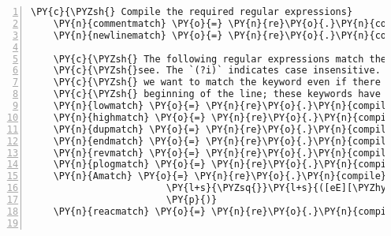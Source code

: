 \begin{Verbatim}[commandchars=\\\{\},fontsize=\small,numbers=left,firstnumber=1,stepnumber=2,firstline=2]
    \PY{c}{\PYZsh{} Compile the required regular expressions}
    \PY{n}{commentmatch} \PY{o}{=} \PY{n}{re}\PY{o}{.}\PY{n}{compile}\PY{p}{(}\PY{l+s}{r\PYZsq{}}\PY{l+s}{\PYZca{}}\PY{l+s}{\PYZbs{}}\PY{l+s}{!}\PY{l+s}{\PYZsq{}}\PY{p}{)}
    \PY{n}{newlinematch} \PY{o}{=} \PY{n}{re}\PY{o}{.}\PY{n}{compile}\PY{p}{(}\PY{l+s}{r\PYZsq{}}\PY{l+s}{\PYZca{}}\PY{l+s}{\PYZbs{}}\PY{l+s}{n}\PY{l+s}{\PYZsq{}}\PY{p}{)}

    \PY{c}{\PYZsh{} The following regular expressions match the keywords we expect to}
    \PY{c}{\PYZsh{}see. The `(?i)` indicates case insensitive. For certain keywords,}
    \PY{c}{\PYZsh{} we want to match the keyword even if there is space at the}
    \PY{c}{\PYZsh{} beginning of the line; these keywords have `\PYZca{}[\PYZbs{}s]*`.}
    \PY{n}{lowmatch} \PY{o}{=} \PY{n}{re}\PY{o}{.}\PY{n}{compile}\PY{p}{(}\PY{l+s}{r\PYZsq{}}\PY{l+s}{(?i)\PYZca{}[}\PY{l+s}{\PYZbs{}}\PY{l+s}{s]*LOW}\PY{l+s}{\PYZsq{}}\PY{p}{)}
    \PY{n}{highmatch} \PY{o}{=} \PY{n}{re}\PY{o}{.}\PY{n}{compile}\PY{p}{(}\PY{l+s}{r\PYZsq{}}\PY{l+s}{(?i)\PYZca{}[}\PY{l+s}{\PYZbs{}}\PY{l+s}{s]*HIGH}\PY{l+s}{\PYZsq{}}\PY{p}{)}
    \PY{n}{dupmatch} \PY{o}{=} \PY{n}{re}\PY{o}{.}\PY{n}{compile}\PY{p}{(}\PY{l+s}{r\PYZsq{}}\PY{l+s}{(?i)}\PY{l+s}{\PYZbs{}}\PY{l+s}{bDUP}\PY{l+s}{\PYZbs{}}\PY{l+s}{b|}\PY{l+s}{\PYZbs{}}\PY{l+s}{bDUPLICATE}\PY{l+s}{\PYZbs{}}\PY{l+s}{b}\PY{l+s}{\PYZsq{}}\PY{p}{)}
    \PY{n}{endmatch} \PY{o}{=} \PY{n}{re}\PY{o}{.}\PY{n}{compile}\PY{p}{(}\PY{l+s}{r\PYZsq{}}\PY{l+s}{(?i)\PYZca{}END}\PY{l+s}{\PYZsq{}}\PY{p}{)}
    \PY{n}{revmatch} \PY{o}{=} \PY{n}{re}\PY{o}{.}\PY{n}{compile}\PY{p}{(}\PY{l+s}{r\PYZsq{}}\PY{l+s}{(?i)\PYZca{}[}\PY{l+s}{\PYZbs{}}\PY{l+s}{s]*REV}\PY{l+s}{\PYZsq{}}\PY{p}{)}
    \PY{n}{plogmatch} \PY{o}{=} \PY{n}{re}\PY{o}{.}\PY{n}{compile}\PY{p}{(}\PY{l+s}{r\PYZsq{}}\PY{l+s}{(?i)\PYZca{}[}\PY{l+s}{\PYZbs{}}\PY{l+s}{s]*PLOG}\PY{l+s}{\PYZsq{}}\PY{p}{)}
    \PY{n}{Amatch} \PY{o}{=} \PY{n}{re}\PY{o}{.}\PY{n}{compile}\PY{p}{(}\PY{l+s}{r\PYZsq{}}\PY{l+s}{((?\PYZlt{}![}\PY{l+s}{\PYZbs{}}\PY{l+s}{w}\PY{l+s}{\PYZbs{}}\PY{l+s}{\PYZhy{}])([\PYZhy{}+]?[0\PYZhy{}9]+(}\PY{l+s}{\PYZbs{}}\PY{l+s}{.[0\PYZhy{}9]+)?}\PY{l+s}{\PYZsq{}}
                        \PY{l+s}{\PYZsq{}}\PY{l+s}{([eE][\PYZhy{}+]?[0\PYZhy{}9]+)?)(?!}\PY{l+s}{\PYZbs{}}\PY{l+s}{w))}\PY{l+s}{\PYZsq{}}
                        \PY{p}{)}
    \PY{n}{reacmatch} \PY{o}{=} \PY{n}{re}\PY{o}{.}\PY{n}{compile}\PY{p}{(}\PY{l+s}{r\PYZsq{}}\PY{l+s}{((\PYZca{}|\PYZca{}[}\PY{l+s}{\PYZbs{}}\PY{l+s}{s]+)[}\PY{l+s}{\PYZbs{}}\PY{l+s}{s}\PY{l+s}{\PYZbs{}}\PY{l+s}{w}\PY{l+s}{\PYZbs{}}\PY{l+s}{d()+=\PYZlt{}\PYZgt{}}\PY{l+s}{\PYZbs{}}\PY{l+s}{\PYZhy{} *.]+?(?=}\PY{l+s}{\PYZbs{}}\PY{l+s}{s}\PY{l+s}{\PYZbs{}}\PY{l+s}{d))}\PY{l+s}{\PYZsq{}}\PY{p}{)}


\end{Verbatim}
